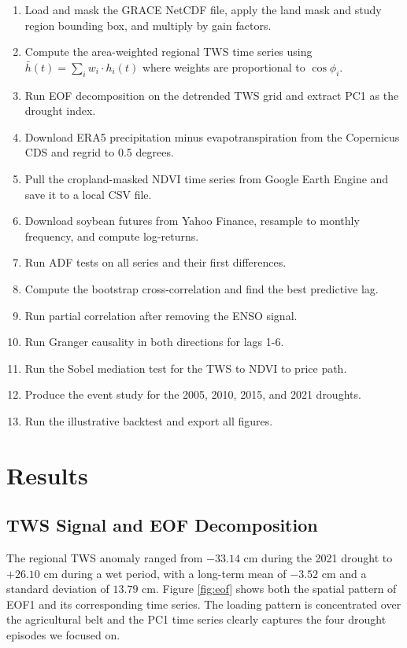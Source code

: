 \documentclass[10pt, twocolumn]{article}
\begin{document}
\begin{enumerate}
  \item Load and mask the GRACE NetCDF file, apply the land mask and
        study region bounding box, and multiply by gain factors.
  \item Compute the area-weighted regional TWS time series using
        $\bar{h}(t) = \sum_i w_i \cdot h_i(t)$ where weights are
        proportional to $\cos\phi_i$.
  \item Run EOF decomposition on the detrended TWS grid and extract
        PC1 as the drought index.
  \item Download ERA5 precipitation minus evapotranspiration from
        the Copernicus CDS and regrid to 0.5 degrees.
  \item Pull the cropland-masked NDVI time series from Google Earth
        Engine and save it to a local CSV file.
  \item Download soybean futures from Yahoo Finance, resample to
        monthly frequency, and compute log-returns.
  \item Run ADF tests on all series and their first differences.
  \item Compute the bootstrap cross-correlation and find the best
        predictive lag.
  \item Run partial correlation after removing the ENSO signal.
  \item Run Granger causality in both directions for lags 1-6.
  \item Run the Sobel mediation test for the TWS to NDVI to price path.
  \item Produce the event study for the 2005, 2010, 2015, and 2021
        droughts.
  \item Run the illustrative backtest and export all figures.
\end{enumerate}

\section{Results}
\label{sec:results}

\subsection{TWS Signal and EOF Decomposition}

The regional TWS anomaly ranged from $-33.14$ cm during the 2021
drought to $+26.10$ cm during a wet period, with a long-term mean
of $-3.52$ cm and a standard deviation of $13.79$ cm. Figure
\ref{fig:eof} shows both the spatial pattern of EOF1 and its
corresponding time series. The loading pattern is concentrated over
the agricultural belt and the PC1 time series clearly captures the
four drought episodes we focused on.
\end{document}
